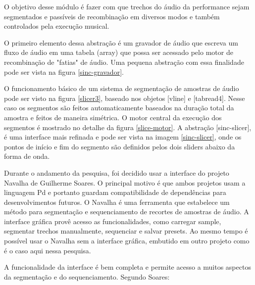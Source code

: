 \documentclass[draft]{ppgmus}
\begin{document}
O objetivo desse módulo é fazer com que trechos do áudio da performance sejam segmentados e 
passíveis de recombinação em diversos modos e também controlados pela execução musical.

O primeiro elemento dessa abstração é um gravador de áudio que escreva um fluxo
de áudio em uma tabela (array) que possa ser acessado pelo motor de recombinação de "fatias" de áudio.
Uma pequena abstração com essa finalidade pode ser vista na figura \ref{sinc-gravador}.

O funcionamento básico de um sistema de segmentação de amostras de áudio pode ser visto na figura \ref{slicer3},
baseado nos objetos [vline\texttildelow] e [tabread4\texttildelow]. Nesse caso os segmentos são feitos
automaticamente baseados na duração total da amostra e feitos de maneira simétrica.
O motor central da execução dos segmentos é mostrado no detalhe da figura \ref{slice-motor}.
A abstração [sinc-slicer], é uma interface mais refinada e pode ser vista na imagem \ref{sinc-slicer}, 
onde os pontos de início e fim do segmento são definidos pelos dois sliders abaixo da forma de onda.

Durante o andamento da pesquisa, foi decidido usar a interface do projeto Navalha de Guilherme Soares.
O principal motivo é que ambos projetos usam a linguagem Pd e portanto guardam compatibilidade de dependências 
para desenvolvimentos futuros.
O Navalha é uma ferramenta que estabelece
um método para segmentação e sequenciamento de recortes de amostras de áudio. A interface gráfica
provê acesso as funcionalidades, como carregar sample, segmentar trechos manualmente, sequenciar e 
salvar presets. Ao mesmo tempo é possível usar o Navalha sem a interface gráfica, embutido em outro
projeto como é o caso aqui nessa pesquisa.

A funcionalidade da interface é bem completa e permite acesso a muitos aspectos da segmentação e do
sequenciamento. Segundo Soares:
\end{document}
